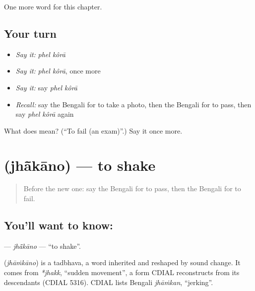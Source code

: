 \begin{grammarlens}[title={What you've built}]
One more word for this chapter.
\end{grammarlens}

\subsection*{Your turn}
\begin{itemize}
\raggedright
  \item \emph{Say it:} \emph{phel kôrā}
  \item \emph{Say it:} \emph{phel kôrā}, once more
  \item \emph{Say it:} say \emph{phel kôrā}
  \item \emph{Recall:} say the Bengali for to take a photo, then the Bengali for to pass, then say \emph{phel kôrā} again
\end{itemize}

\begin{tcolorbox}[breakable,colback=teal!4,colframe=teal!35!black,title={Before you move on}]
What does   mean? (\textquotedblleft{}To fail (an exam)\textquotedblright{}.) Say it once more.
\end{tcolorbox}
\section[\texorpdfstring{\bn{ঝাঁকানো} (jhā̃kāno)}{ঝাঁকানো (jhā̃kāno)}]{ (jhā̃kāno) — to shake}

\label{lesson:BN-C214-jhakano}



\begin{quote}
Before the new one: say the Bengali for to pass, then the Bengali for to fail.
\end{quote}

\subsection*{You'll want to know: }
\textbf{} — \emph{jhā̃kāno} — \textquotedblleft{}to shake\textquotedblright{}.

\begin{cousinweb}
\textbf{} (\emph{jhāṁkāno}) is a tadbhava, a word inherited and reshaped by sound change. It comes from \emph{*jhakk}, \textquotedblleft{}sudden movement\textquotedblright{}, a form CDIAL reconstructs from its descendants (CDIAL 5316). CDIAL lists Bengali \emph{jhāṁkan}, \textquotedblleft{}jerking\textquotedblright{}.
\end{cousinweb}

